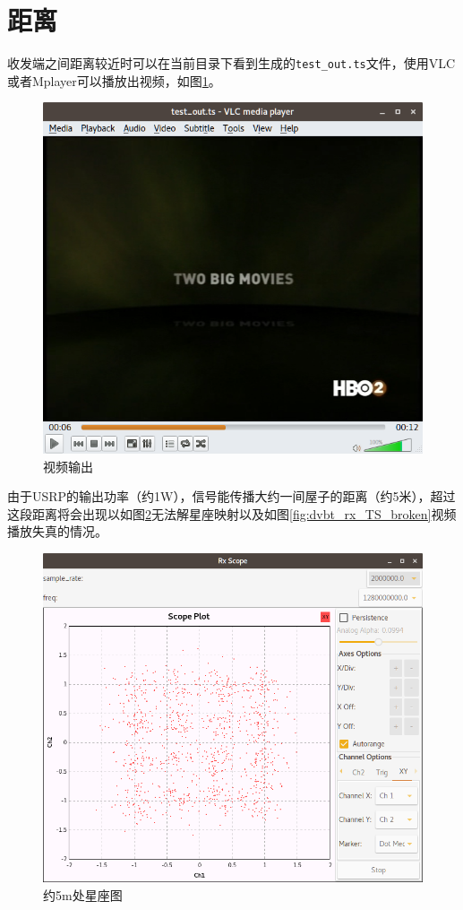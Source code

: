 	\section{距离}
		\par 收发端之间距离较近时可以在当前目录下看到生成的\lstinline[language=sh]{test_out.ts}文件，使用VLC或者Mplayer可以播放出视频，如图\ref{fig:dvbt_rx_TS}。
		\begin{figure}[htp]
			\centering
			\includegraphics[width=13cm]{figures/dvbt_rx_TS.png}
			\caption{视频输出}
			\label{fig:dvbt_rx_TS}
		\end{figure}
		\par 由于USRP的输出功率（约1W），信号能传播大约一间屋子的距离（约5米），超过这段距离将会出现以如图\ref{fig:dvbt_rx_2MHz_ranged_2}无法解星座映射以及如图\ref{fig:dvbt_rx_TS_broken}视频播放失真的情况。
		\begin{figure}[htp]
			\centering
			\includegraphics[width=13cm]{figures/dvbt_rx_2MHz_ranged_2.png}
			\caption{约5m处星座图}
			\label{fig:dvbt_rx_2MHz_ranged_2}
		\end{figure}
